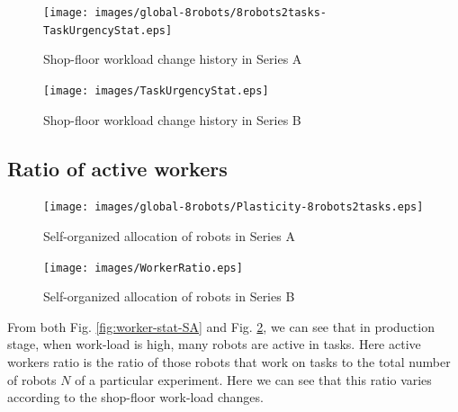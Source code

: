\documentclass[preprint,12pt]{elsarticle}
\begin{document}
\begin{figure}
\centering
\texttt{[image: images/global-8robots/8robots2tasks-TaskUrgencyStat.eps]}
\caption{\small Shop-floor workload change history in Series A} 
\label{fig:urgency-stat-SA} %
\centering
\texttt{[image: images/TaskUrgencyStat.eps]}
\caption{\small Shop-floor workload change history in Series B} %
\label{fig:urgency-stat-SB} %
\end{figure}
\subsection*{Ratio of active workers}
\begin{figure}
\centering
\texttt{[image: images/global-8robots/Plasticity-8robots2tasks.eps]}
\caption{\small Self-organized allocation of robots in Series A}
\label{fig:worker-stat-SA}
%
\centering
\texttt{[image: images/WorkerRatio.eps]}
\caption{\small Self-organized allocation of robots in Series B }
\label{fig:worker-stat-SB} %
\end{figure}
From both Fig. \ref{fig:worker-stat-SA} and Fig. \ref{fig:worker-stat-SB}, we can  see that in production stage, when work-load is high, many robots are active in tasks. Here active workers ratio is the ratio of those robots that work on tasks to the total number of robots $N$ of a particular experiment.   Here we can see that this ratio varies according to the shop-floor work-load changes.
\end{document}
